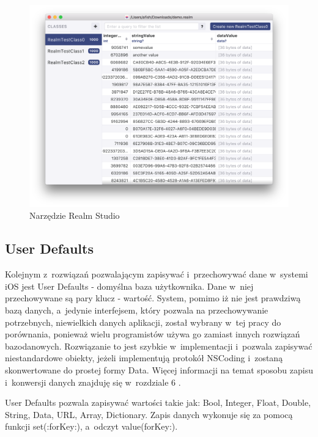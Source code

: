 \begin{figure}[h]
	\includegraphics[width=\linewidth]{img/RealmStudio.png}
	\caption{Narzędzie Realm Studio}
	\label{fig: RealmStudio}
\end{figure}

\subsection{User Defaults}

Kolejnym z~rozwiązań pozwalającym zapisywać i~przechowywać dane w~systemi iOS jest User Defaults - domyślna baza użytkownika. Dane w~niej przechowywane są pary klucz - wartość. System, pomimo iż nie jest prawdziwą bazą danych, a~jedynie interfejsem, który pozwala na przechowywanie potrzebnych, niewielkich danych aplikacji, został wybrany w~tej pracy do porównania, ponieważ wielu programistów używa go zamiast innych rozwiązań bazodanowych. Rozwiązanie to jest szybkie w~implementacji i~pozwala zapisywać niestandardowe obiekty, jeżeli implementują protokół NSCoding i~zostaną skonwertowane do prostej formy Data. Więcej informacji na temat sposobu zapisu i~konwersji danych znajduję się w~rozdziale 6 . \par
  
User Defaults pozwala zapisywać wartości takie jak: Bool, Integer, Float, Double, String, Data, URL, Array, Dictionary. Zapis danych wykonuje się za pomocą funkcji set(:forKey:), a~odczyt value(forKey:). 